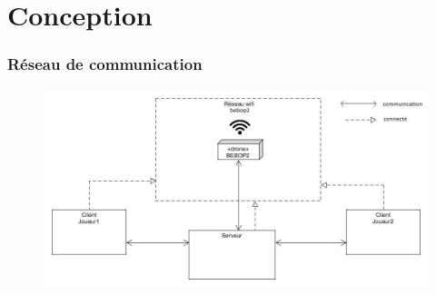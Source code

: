 \section{Conception}

\begin{frame}
\frametitle{Réseau de communication}
\begin{center}
\begin{figure}
\includegraphics[scale=0.45]{images/architecture.jpg}
\end{figure}
\end{center}
\end{frame}


